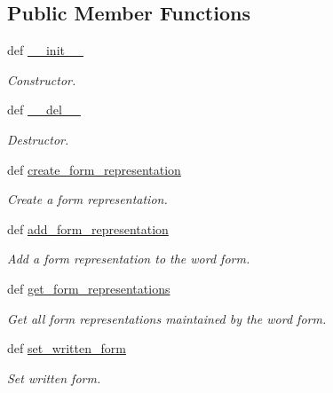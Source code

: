 \subsection*{Public Member Functions}
\begin{DoxyCompactItemize}
\item 
def \hyperlink{classlmf_1_1src_1_1morphology_1_1word__form_1_1_word_form_afcc4ec0d271e48a7f35920a1e91aa9b9}{\+\_\+\+\_\+init\+\_\+\+\_\+}
\begin{DoxyCompactList}\small\item\em Constructor. \end{DoxyCompactList}\item 
def \hyperlink{classlmf_1_1src_1_1morphology_1_1word__form_1_1_word_form_aa7b79f6c8c3bd98e57b7d2bc60a9b88c}{\+\_\+\+\_\+del\+\_\+\+\_\+}
\begin{DoxyCompactList}\small\item\em Destructor. \end{DoxyCompactList}\item 
def \hyperlink{classlmf_1_1src_1_1morphology_1_1word__form_1_1_word_form_a35cc3cb1ceda558386c81cf88374b96b}{create\+\_\+form\+\_\+representation}
\begin{DoxyCompactList}\small\item\em Create a form representation. \end{DoxyCompactList}\item 
def \hyperlink{classlmf_1_1src_1_1morphology_1_1word__form_1_1_word_form_a9074b17bb3d1ebcd32b5c8b8fbc3eeda}{add\+\_\+form\+\_\+representation}
\begin{DoxyCompactList}\small\item\em Add a form representation to the word form. \end{DoxyCompactList}\item 
def \hyperlink{classlmf_1_1src_1_1morphology_1_1word__form_1_1_word_form_af5ca5e6fdf8232fb5354b2d5e520f372}{get\+\_\+form\+\_\+representations}
\begin{DoxyCompactList}\small\item\em Get all form representations maintained by the word form. \end{DoxyCompactList}\item 
def \hyperlink{classlmf_1_1src_1_1morphology_1_1word__form_1_1_word_form_a7bc4d5336de970c8adf7a8cdfc5c74ba}{set\+\_\+written\+\_\+form}
\begin{DoxyCompactList}\small\item\em Set written form. \end{DoxyCompactList}\item 

\end{DoxyCompactItemize}
